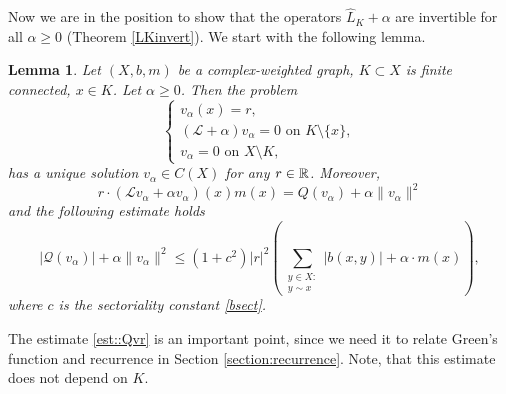 \documentclass[a4paper,11pt]{amsart}
\newtheorem{lemma}[theorem]{Lemma}
\theoremstyle{definition}
\renewcommand{\L}{\mathcal{L}}
\begin{document}
Now we are in the position to show that the operators $\widehat L_K+\alpha$ are invertible for all $\alpha\ge 0$ (Theorem \ref{LKinvert}). We start with the following lemma.
\begin{lemma}\label{lem::dirprr}
Let $(X,b,m)$ be a complex-weighted graph, $K\subset X$ is finite connected, $x\in K$. Let $\alpha\ge 0$. Then the problem
\begin{equation}\label{prob::dirpralpha}
\begin{cases}
v_\alpha(x)=r,\\
(\L +\alpha)v_\alpha=0\mbox{ on  }K\setminus\{x\},\\
v_\alpha= 0 \mbox{ on  }X\setminus K,
\end{cases}
\end{equation}
has a unique solution $v_\alpha\in C(X)$ for any $r\in \Bbb R$. Moreover, 
\begin{equation}\label{eq::aLplusalphaQ}
r\cdot (\L v_\alpha+\alpha v_\alpha)(x)m(x)=Q(v_\alpha)+\alpha \|v_\alpha\|^2
\end{equation}
 and the following estimate holds
\begin{equation}\label{est::Qvr}
|\mathcal Q(v_\alpha)|+\alpha \|v_\alpha\|^2\le (1+c^2)|r|^2\left(\sum_{\substack{y\in X:\\y\sim x}}|b(x,y)|+\alpha\cdot m(x)\right),
\end{equation}
where $c$ is the sectoriality constant \eqref{bsect}.
\end{lemma}
The estimate \eqref{est::Qvr} is an important point, since we need it to relate Green's function and recurrence in Section \ref{section:recurrence}. Note, that this estimate does not depend on $K$.
\end{document}
